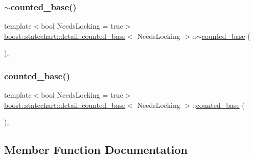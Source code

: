 \subsubsection{\texorpdfstring{$\sim$counted\+\_\+base()}{~counted\_base()}}
{\footnotesize\ttfamily template$<$bool Needs\+Locking = true$>$ \\
\mbox{\hyperlink{classboost_1_1statechart_1_1detail_1_1counted__base}{boost\+::statechart\+::detail\+::counted\+\_\+base}}$<$ Needs\+Locking $>$\+::$\sim$\mbox{\hyperlink{classboost_1_1statechart_1_1detail_1_1counted__base}{counted\+\_\+base}} (\begin{DoxyParamCaption}{ }\end{DoxyParamCaption})\hspace{0.3cm}{\ttfamily [inline]}, {\ttfamily [protected]}}

\mbox{\label{classboost_1_1statechart_1_1detail_1_1counted__base_aa3cedacab57a4eef2767c7de66f2c774}} 
\subsubsection{\texorpdfstring{counted\+\_\+base()}{counted\_base()}\hspace{0.1cm}{\footnotesize\ttfamily [2/2]}}
{\footnotesize\ttfamily template$<$bool Needs\+Locking = true$>$ \\
\mbox{\hyperlink{classboost_1_1statechart_1_1detail_1_1counted__base}{boost\+::statechart\+::detail\+::counted\+\_\+base}}$<$ Needs\+Locking $>$\+::\mbox{\hyperlink{classboost_1_1statechart_1_1detail_1_1counted__base}{counted\+\_\+base}} (\begin{DoxyParamCaption}\item[{const \mbox{\hyperlink{classboost_1_1statechart_1_1detail_1_1counted__base}{counted\+\_\+base}}$<$ Needs\+Locking $>$ \&}]{ }\end{DoxyParamCaption})\hspace{0.3cm}{\ttfamily [inline]}, {\ttfamily [protected]}}



\subsection{Member Function Documentation}
\mbox{\label{classboost_1_1statechart_1_1detail_1_1counted__base_aefaa0b61dac7d928ed816db1e74c7c16}} 

